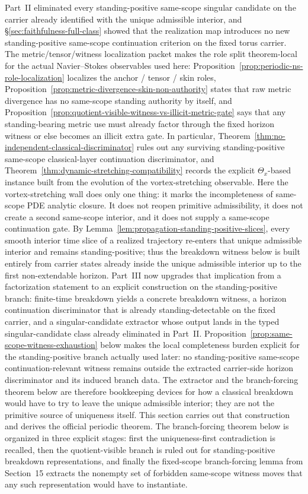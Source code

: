 Part~II eliminated every standing-positive same-scope singular candidate on the carrier already identified with the unique admissible interior, and \S\ref{sec:faithfulness-full-class} showed that the realization map introduces no new standing-positive same-scope continuation criterion on the fixed torus carrier. The metric/tensor/witness localization packet makes the role split theorem-local for the actual Navier--Stokes observables used here: Proposition~\ref{prop:periodic-ns-role-localization} localizes the anchor / tensor / skin roles, Proposition~\ref{prop:metric-divergence-skin-non-authority} states that raw metric divergence has no same-scope standing authority by itself, and Proposition~\ref{prop:quotient-visible-witness-vs-illicit-metric-gate} says that any standing-bearing metric use must already factor through the fixed horizon witness or else becomes an illicit extra gate. In particular, Theorem~\ref{thm:no-independent-classical-discriminator} rules out any surviving standing-positive same-scope classical-layer continuation discriminator, and Theorem~\ref{thm:dynamic-stretching-compatibility} records the explicit $\Theta_x$-based instance built from the evolution of the vortex-stretching observable. Here the vortex-stretching wall does only one thing: it marks the incompleteness of same-scope PDE analytic closure. It does not reopen primitive admissibility, it does not create a second same-scope interior, and it does not supply a same-scope continuation gate. By Lemma~\ref{lem:propagation-standing-positive-slices}, every smooth interior time slice of a realized trajectory re-enters that unique admissible interior and remains standing-positive; thus the breakdown witness below is built entirely from carrier states already inside the unique admissible interior up to the first non-extendable horizon. Part~III now upgrades that implication from a factorization statement to an explicit construction on the standing-positive branch: finite-time breakdown yields a concrete breakdown witness, a horizon continuation discriminator that is already standing-detectable on the fixed carrier, and a singular-candidate extractor whose output lands in the typed singular-candidate class already eliminated in Part~II. Proposition~\ref{prop:same-scope-witness-exhaustion} below makes the local completeness burden explicit for the standing-positive branch actually used later: no standing-positive same-scope continuation-relevant witness remains outside the extracted carrier-side horizon discriminator and its induced branch data. The extractor and the branch-forcing theorem below are therefore bookkeeping devices for how a classical breakdown would have to try to leave the unique admissible interior; they are not the primitive source of uniqueness itself. This section carries out that construction and derives the official periodic theorem. The branch-forcing theorem below is organized in three explicit stages: first the uniqueness-first contradiction is recalled, then the quotient-visible branch is ruled out for standing-positive breakdown representations, and finally the fixed-scope branch-forcing lemma from Section~15 extracts the nonempty set of forbidden same-scope witness moves that any such representation would have to instantiate.

